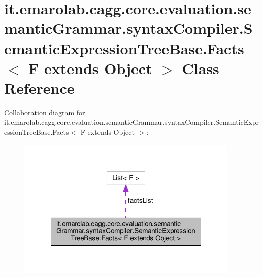 \hypertarget{classit_1_1emarolab_1_1cagg_1_1core_1_1evaluation_1_1semanticGrammar_1_1syntaxCompiler_1_1Semanta17363eb7db3bfea12328c626a3d6723}{\section{it.\-emarolab.\-cagg.\-core.\-evaluation.\-semantic\-Grammar.\-syntax\-Compiler.\-Semantic\-Expression\-Tree\-Base.\-Facts$<$ F extends Object $>$ Class Reference}
\label{classit_1_1emarolab_1_1cagg_1_1core_1_1evaluation_1_1semanticGrammar_1_1syntaxCompiler_1_1Semanta17363eb7db3bfea12328c626a3d6723}
}


Collaboration diagram for it.\-emarolab.\-cagg.\-core.\-evaluation.\-semantic\-Grammar.\-syntax\-Compiler.\-Semantic\-Expression\-Tree\-Base.\-Facts$<$ F extends Object $>$\-:\nopagebreak
\begin{figure}[H]
\begin{center}
\leavevmode
\includegraphics[width=300pt]{classit_1_1emarolab_1_1cagg_1_1core_1_1evaluation_1_1semanticGrammar_1_1syntaxCompiler_1_1Semant50dbe27f4d547d7ec640e865b046f77a}
\end{center}
\end{figure}
